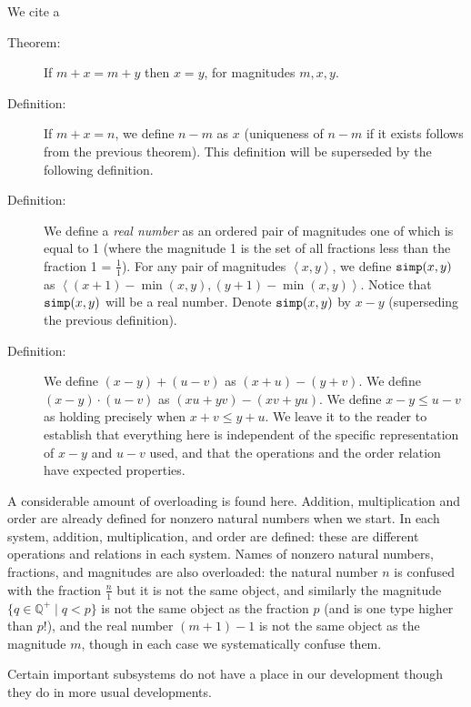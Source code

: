 \documentclass[12pt]{book}
\begin{document}
We cite a

\begin{description}

\item[Theorem:]  If $m+x = m+y$ then $x=y$, for magnitudes $m,x,y$.

\item[Definition:] If $m+x=n$, we define $n-m$ as $x$ (uniqueness of
$n-m$ if it exists follows from the previous theorem).  This definition
will be superseded by the following definition.

\item[Definition:] We define a {\em real number\/} as an ordered pair
of magnitudes one of which is equal to 1 (where the magnitude 1 is the
set of all fractions less than the fraction 1 = $\frac 11$).  For any
pair of magnitudes $\left<x,y\right>$, we define ${\tt simp}(x,y)$ as
$\left<(x+1)-\min(x,y),(y+1)-\min(x,y)\right>$.  Notice that ${\tt
simp}(x,y)$ will be a real number.  Denote ${\tt simp}(x,y)$ by $x-y$
(superseding the previous definition).

\item[Definition:] We define $(x-y)+(u-v)$ as $(x+u)-(y+v)$.  We
define $(x-y)\cdot(u-v)$ as $(xu+yv)-(xv+yu)$.  We define $x-y \leq
u-v$ as holding precisely when $x+v \leq y+u$.  We leave it to the
reader to establish that everything here is independent of the
specific representation of $x-y$ and $u-v$ used, and that the
operations and the order relation have expected properties.

\end{description}

A considerable amount of overloading is found here.  Addition,
multiplication and order are already defined for nonzero natural
numbers when we start.  In each system, addition, multiplication, and
order are defined: these are different operations and relations in
each system.  Names of nonzero natural numbers, fractions, and
magnitudes are also overloaded: the natural number $n$ is confused
with the fraction $\frac n1$ but it is not the same object, and
similarly the magnitude $\{q \in {\mathbb Q}^+\mid q<p\}$ is not the
same object as the fraction $p$ (and is one type higher than $p$!), and the real number $(m+1)-1$ is not
the same object as the magnitude $m$, though in each case we
systematically confuse them.

Certain important subsystems do not have a place in our development
though they do in more usual developments.
\end{document}
